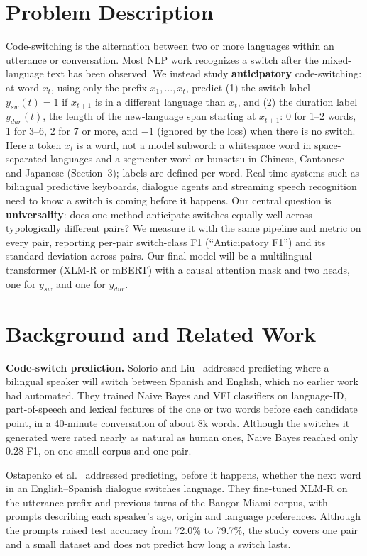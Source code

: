 \documentclass[sigconf]{acmart}
\begin{document}
\section{Problem Description}
Code-switching is the alternation between two or more languages within an utterance or conversation. Most NLP work
recognizes a switch after the mixed-language text has been observed. We instead study \textbf{anticipatory}
code-switching: at word $x_t$, using only the prefix $x_1,\dots,x_t$, predict (1) the switch label
$y_{sw}(t)=1$ if $x_{t+1}$ is in a different language than $x_t$, and (2) the duration label $y_{dur}(t)$, the length
of the new-language span starting at $x_{t+1}$: 0 for 1--2 words, 1 for 3--6, 2 for 7 or more, and $-1$ (ignored by
the loss) when there is no switch. Here a token $x_t$ is a word, not a model subword: a whitespace word in
space-separated languages and a segmenter word or bunsetsu in Chinese, Cantonese and Japanese (Section~3); labels
are defined per word. Real-time systems such as bilingual predictive keyboards, dialogue agents and
streaming speech recognition need to know a switch is coming before it happens.
Our central question is \textbf{universality}: does one method anticipate switches equally well across typologically
different pairs? We measure it with the same pipeline and metric on every pair, reporting per-pair switch-class F1
(``Anticipatory F1'') and its standard deviation across pairs. Our final model will be a multilingual transformer
(XLM-R or mBERT) with a causal attention mask and two heads, one for $y_{sw}$ and one for $y_{dur}$.

\section{Background and Related Work}
\textbf{Code-switch prediction.} Solorio and Liu~\cite{solorio2008learning} addressed predicting where a bilingual
speaker will switch between Spanish and English, which no earlier work had automated. They trained Naive Bayes and
VFI classifiers on language-ID, part-of-speech and lexical features of the one or two words before each candidate
point, in a 40-minute conversation of about 8k words. Although the switches it generated were rated nearly as natural
as human ones, Naive Bayes reached only 0.28 F1, on one small corpus and one pair.

Ostapenko et al.~\cite{ostapenko2022speaker} addressed predicting, before it happens, whether the next word in an
English--Spanish dialogue switches language. They fine-tuned XLM-R on the utterance prefix and previous turns of the
Bangor Miami corpus, with prompts describing each speaker's age, origin and language preferences. Although the
prompts raised test accuracy from 72.0\% to 79.7\%, the study covers one pair and a small dataset and does not predict
how long a switch lasts.
\end{document}
